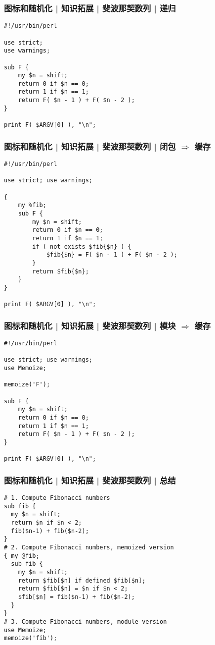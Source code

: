 \begin{frame}[fragile]
  \frametitle{图标和随机化 | 知识拓展 | 斐波那契数列 | 递归}
  \vspace{-1.5em}
\begin{lstlisting}
#!/usr/bin/perl

use strict;
use warnings;

sub F {
    my $n = shift;
    return 0 if $n == 0;
    return 1 if $n == 1;
    return F( $n - 1 ) + F( $n - 2 );
}

print F( $ARGV[0] ), "\n";
\end{lstlisting}
\end{frame}

\begin{frame}[fragile]
  \frametitle{图标和随机化 | 知识拓展 | 斐波那契数列 | \alert{闭包 $\Rightarrow$ 缓存}}
  \vspace{-1.5em}
\begin{lstlisting}[basicstyle=\small\tt]
#!/usr/bin/perl

use strict; use warnings;

{
    my %fib;
    sub F {
        my $n = shift;
        return 0 if $n == 0;
        return 1 if $n == 1;
        if ( not exists $fib{$n} ) {
            $fib{$n} = F( $n - 1 ) + F( $n - 2 );
        }
        return $fib{$n};
    }
}

print F( $ARGV[0] ), "\n";
\end{lstlisting}
\end{frame}

\begin{frame}[fragile]
  \frametitle{图标和随机化 | 知识拓展 | 斐波那契数列 | 模块 $\Rightarrow$ 缓存}
  \vspace{-1.5em}
\begin{lstlisting}
#!/usr/bin/perl

use strict; use warnings;
use Memoize;

memoize('F');

sub F {
    my $n = shift;
    return 0 if $n == 0;
    return 1 if $n == 1;
    return F( $n - 1 ) + F( $n - 2 );
}

print F( $ARGV[0] ), "\n";
\end{lstlisting}
\end{frame}

\begin{frame}[fragile]
  \frametitle{图标和随机化 | 知识拓展 | 斐波那契数列 | 总结}
  \vspace{-1.5em}
  \begin{lstlisting}[basicstyle=\small\tt]
# 1. Compute Fibonacci numbers
sub fib {
  my $n = shift;
  return $n if $n < 2;
  fib($n-1) + fib($n-2);
}
# 2. Compute Fibonacci numbers, memoized version
{ my @fib;
  sub fib {
    my $n = shift;
    return $fib[$n] if defined $fib[$n];
    return $fib[$n] = $n if $n < 2;
    $fib[$n] = fib($n-1) + fib($n-2);
  }
}
# 3. Compute Fibonacci numbers, module version
use Memoize;
memoize('fib');
\end{lstlisting}
\end{frame}

